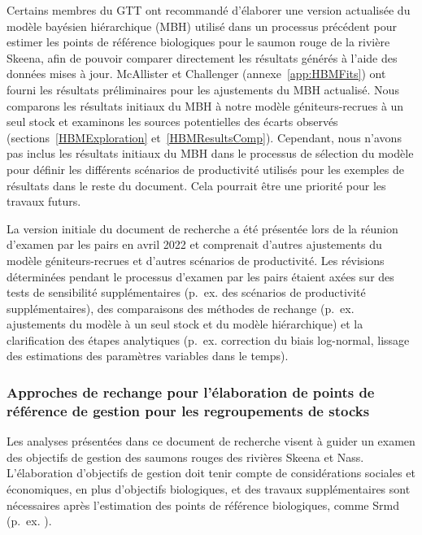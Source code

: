 \documentclass[french,11pt]{book}
\begin{document}
Certains membres du GTT ont recommandé d'élaborer une version actualisée du modèle bayésien hiérarchique (MBH) utilisé dans un processus précédent pour estimer les points de référence biologiques pour le saumon rouge de la rivière Skeena, afin de pouvoir comparer directement les résultats générés à l'aide des données mises à jour. McAllister et Challenger (annexe~\ref{app:HBMFits}) ont fourni les résultats préliminaires pour les ajustements du MBH actualisé. Nous comparons les résultats initiaux du MBH à notre modèle géniteurs-recrues à un seul stock et examinons les sources potentielles des écarts observés (sections~\ref{HBMExploration} et~\ref{HBMResultsComp}). Cependant, nous n'avons pas inclus les résultats initiaux du MBH dans le processus de sélection du modèle pour définir les différents scénarios de productivité utilisés pour les exemples de résultats dans le reste du document. Cela pourrait être une priorité pour les travaux futurs.

La version initiale du document de recherche a été présentée lors de la réunion d'examen par les pairs en avril 2022 et comprenait d'autres ajustements du modèle géniteurs-recrues et d'autres scénarios de productivité. Les révisions déterminées pendant le processus d'examen par les pairs étaient axées sur des tests de sensibilité supplémentaires (p.~ex. des scénarios de productivité supplémentaires), des comparaisons des méthodes de rechange (p.~ex. ajustements du modèle à un seul stock et du modèle hiérarchique) et la clarification des étapes analytiques (p.~ex. correction du biais log-normal, lissage des estimations des paramètres variables dans le temps).

\subsubsection{Approches de rechange pour l'élaboration de points de référence de gestion pour les regroupements de stocks}\label{AltApproachesOverview}

Les analyses présentées dans ce document de recherche visent à guider un examen des objectifs de gestion des saumons rouges des rivières Skeena et Nass. L'élaboration d'objectifs de gestion doit tenir compte de considérations sociales et économiques, en plus d'objectifs biologiques, et des travaux supplémentaires sont nécessaires après l'estimation des points de référence biologiques, comme Srmd (p.~ex. ).
\end{document}

